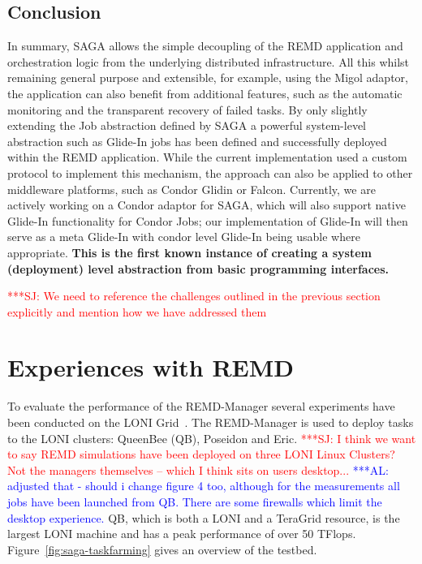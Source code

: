 \documentclass{rspublic}
\newcommand{\alnote}[1]{ {\textcolor{blue} { ***AL: #1 }}}
\newcommand{\jhanote}[1]{ {\textcolor{red} { ***SJ: #1 }}}
\newcommand{\alnote}[1]{}
\newcommand{\jhanote}[1]{}
\newcommand{\glidein}[1]{Glide-In }
\begin{document}
\subsection{Conclusion}
In summary, SAGA allows the simple decoupling of the REMD application
and orchestration logic from the underlying distributed
infrastructure. All this whilst remaining general purpose and
extensible, for example, using the Migol adaptor, the application can
also benefit from additional features, such as the automatic
monitoring and the transparent recovery of failed tasks. By only
slightly extending the Job abstraction defined by SAGA a powerful
system-level abstraction such as \glidein\ jobs has been defined and
successfully deployed within the REMD application. While the current
implementation used a custom protocol to implement this mechanism, the
approach can also be applied to other middleware platforms, such as
Condor Glidin or Falcon. Currently, we are actively working on a
Condor adaptor for SAGA, which will also support native \glidein\
functionality for Condor Jobs; our implementation of \glidein\ will
then serve as a meta \glidein\, with condor level \glidein\ being usable
where appropriate.
{\bf This is the first known instance of creating a system
  (deployment) level abstraction from basic programming interfaces.}



\jhanote{We need to reference the challenges outlined in the previous
  section explicitly and mention how we have addressed them}

\section{Experiences with REMD}
\label{sec:exp}       
        
To evaluate the performance of the REMD-Manager several
experiments have been conducted on the LONI
Grid~\citep{loni}. The REMD-Manager is used to deploy tasks to
the LONI clusters: QueenBee (QB), Poseidon and Eric.  \jhanote{I think
  we want to say REMD simulations have been deployed on three LONI
  Linux Clusters? Not the managers themselves -- which I think sits on
  users desktop...}  \alnote{adjusted that - should i change figure 4
  too, although for the measurements all jobs have been launched from
  QB. There are some firewalls which limit the desktop experience.}
QB, which is both a LONI and a TeraGrid resource, is the largest LONI
machine and has a peak performance of over 50 TFlops.
Figure~\ref{fig:saga-taskfarming} gives an overview of the testbed.
\end{document}
